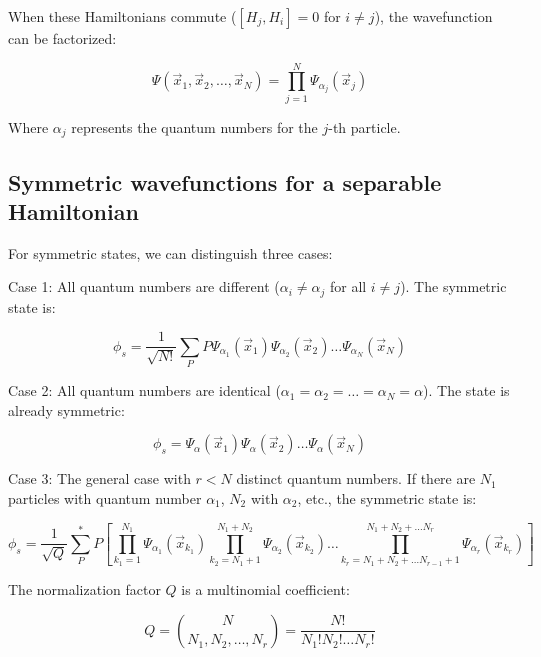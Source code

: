\documentclass[italian]{HKNdocument}
\begin{document}
When these Hamiltonians commute ($[H_j,H_i]=0$ for $i\neq j$), the wavefunction can be factorized:

\begin{equation}
\Psi(\vec{x}_1,\vec{x}_2,\ldots,\vec{x}_N)=\prod_{j=1}^{N}\Psi_{\alpha_j}(\vec{x}_j) \label{eq:14.20}
\end{equation}

Where $\alpha_j$ represents the quantum numbers for the $j$-th particle.

\subsection{Symmetric wavefunctions for a separable Hamiltonian}
For symmetric states, we can distinguish three cases:

Case 1: All quantum numbers are different ($\alpha_i\neq\alpha_j$ for all $i\neq j$). The symmetric state is:

\begin{equation}
\phi_s=\frac{1}{\sqrt{N!}}\sum_P P\Psi_{\alpha_1}(\vec{x}_1)\Psi_{\alpha_2}(\vec{x}_2)\ldots\Psi_{\alpha_N}(\vec{x}_N) \label{eq:14.21}
\end{equation}

Case 2: All quantum numbers are identical ($\alpha_1=\alpha_2=\ldots=\alpha_N=\alpha$). The state is already symmetric:

\begin{equation}
\phi_s=\Psi_{\alpha}(\vec{x}_1)\Psi_{\alpha}(\vec{x}_2)\ldots\Psi_{\alpha}(\vec{x}_N) \label{eq:14.22}
\end{equation}

Case 3: The general case with $r<N$ distinct quantum numbers. If there are $N_1$ particles with quantum number $\alpha_1$, $N_2$ with $\alpha_2$, etc., the symmetric state is:

\begin{equation}
\phi_s=\frac{1}{\sqrt{Q}}\sum_P^* P\left[\prod_{k_1=1}^{N_1}\Psi_{\alpha_1}(\vec{x}_{k_1})\prod_{k_2=N_1+1}^{N_1+N_2}\Psi_{\alpha_2}(\vec{x}_{k_2})\ldots\prod_{k_r=N_1+N_2+\ldots N_{r-1}+1}^{N_1+N_2+\ldots N_r}\Psi_{\alpha_r}(\vec{x}_{k_r})\right] \label{eq:14.23}
\end{equation}

The normalization factor $Q$ is a multinomial coefficient:

\begin{equation}
Q=\binom{N}{N_1,N_2,\ldots,N_r}=\frac{N!}{N_1!N_2!\ldots N_r!} \label{eq:14.24}
\end{equation}
\end{document}
